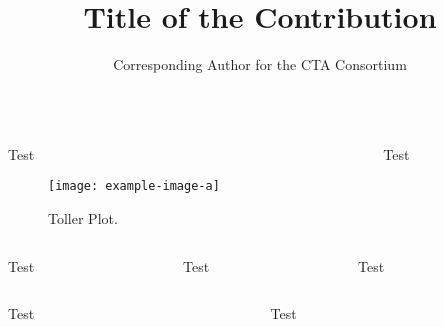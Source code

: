 \documentclass[t]{beamer}
\title{Title of the Contribution}
\author{Corresponding Author for the CTA Consortium}
\newlength{\thirdtextwidth}
\begin{document}
%
\begin{columns}[onlytextwidth]%
  \begin{column}{\textwidth}%
    \begin{block}
      \blindtext[2]
    \end{block}
  \end{column}%
\end{columns}%
\begin{columns}[onlytextwidth]%
  \begin{column}{0.5\textwidth}%
    \begin{block}[equal height group=A]{Test}%
      \begin{multicols}{2}
        \begin{figure}
          \texttt{[image: example-image-a]}\\
          \caption{Toller Plot.\cite{fact-performance}}\label{fig:tollerplot}
        \end{figure}
        \columnbreak
        \blindtext
      \end{multicols}
    \end{block}%
  \end{column}%
  \begin{column}{0.5\textwidth}%
    \begin{alertblock}[equal height group=A]{Test}%
      \begin{multicols}{2}
        \blindtext\cite{fact-reference}
        \blindtext 
      \end{multicols}
    \end{alertblock}%
  \end{column}%
\end{columns}%
\begin{columns}[c, onlytextwidth]%
  \begin{column}{\thirdtextwidth}%
    \begin{exampleblock}{Test}%
      \blindtext%
    \end{exampleblock}%
  \end{column}%
  \begin{column}{\thirdtextwidth}%
    \begin{block}{Test}%
      \blindtext%
    \end{block}%
  \end{column}%
  \begin{column}{\thirdtextwidth}%
    \begin{block}{Test}%
      \blindtext%
    \end{block}%
  \end{column}%
\end{columns}%
\begin{columns}[onlytextwidth]%
  \begin{column}{0.5\textwidth}%
    \begin{block}{Test}%
      \blindtext%
    \end{block}%
  \end{column}%
  \begin{column}{0.5\textwidth}%
    \begin{block}{Test}%
      \blindtext%
    \end{block}%
  \end{column}%
\end{columns}%
\end{document}
